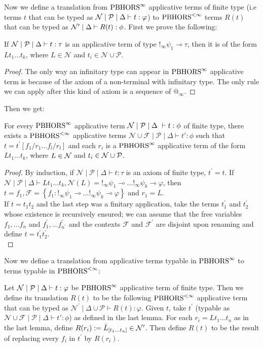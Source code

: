 Now we define a translation from $\text{PBHORS}^{\infty}$ applicative terms of finite type (i.e terms $t$ that can be typed as $\mathcal{N}\mid\mathcal{P}\mid\Delta\vdash t: \varphi $) to $\text{PBHORS}^{<\infty}$ terms $R(t)$ that can be typed as $\mathcal{N}' \mid \Delta \vdash R(t): \phi$. 
First we prove the following:
\begin{lemma}
	If $\mathcal{N}\mid\mathcal{P}\mid\Delta \vdash t: \tau$ is an applicative term of type $!_{\infty} \psi_{1} \multimap \tau$, then it is of the form $L t_{1} \ldots t_{k}$, where $L \in \mathcal{N}$ and $t_{i} \in \mathcal{N} \cup \mathcal{P}$.
\end{lemma}
\begin{proof}
	The only way an infinitary type can appear in $\text{PBHORS}^{\infty}$ applicative term is because of the axiom of a non-terminal with infinitary type. The only rule we can apply after this kind of axiom is a sequence of $@_\infty$.
\end{proof}
Then we get: 
\begin{lemma}
	For every $\text{PBHORS}^{\infty}$ applicative term $\mathcal{N}\mid\mathcal{P}\mid\Delta\ \vdash t: \phi$ of finite type, there exists a $\text{PBHORS}^{<\infty}$ applicative terms $\mathcal{N} \cup \mathcal{F}\mid \mathcal{P}\mid\Delta \vdash t': \phi$ such that $t=t^{\prime}\left[f_{1} / r_{1} \ldots f_{l} / r_{l}\right]$ and each $r_{i}$ is a $\text{PBHORS}^{\infty}$ applicative term of the form $ L t_{1} \ldots t_{k}$, where $L \in \mathcal{N}$ and $t_{i} \in \mathcal{N} \cup \mathcal{P}$.
\end{lemma}
\begin{proof} By induction, if $\mathcal{N}\mid \mathcal{P}\mid \Delta \vdash t: \tau$ is an axiom of finite type, $t^{\prime}=t$. If $\mathcal{N} \mid \mathcal{P} \mid \Delta \vdash L t_1 \dots t_k, \mathcal{N}(L)= !_{\infty} \psi_1 \multimap \ldots !_{\infty} \psi_k \multimap \varphi$, then $t=f_{1}, \mathcal{F}=\left\{f_{1}:  !_{\infty} \psi_1 \multimap \ldots !_{\infty} \psi_k \multimap \varphi\right\}$ and $r_{1}=L$.\\
If $t=t_{1} t_{2}$ and the last step was a finitary application, take the terms $t_{1}^{\prime}$ and $t_{2}^{\prime}$ whose existence is recursively ensured; we can assume that the free variables $f_{1}, \ldots f_{n}$ and $f_{1}^{\prime}, \ldots f_{n^{\prime}}^{\prime}$ and the contexts $\mathcal{F}$ and $\mathcal{F}^{\prime}$ are disjoint upon renaming and define $t=t_{1}^{\prime} t_{2}^{\prime}$.\\
\end{proof}
Now we define a translation from applicative terms typable in $\text{PBHORS}^{\infty}$ to terms typable in $\text{PBHORS}^{<\infty}$: 
\begin{definition}
 Let $\mathcal{N}\mid \mathcal{P}\mid \Delta \vdash t: \varphi$ be $\text{PBHORS}^{\infty}$ applicative term of finite type. Then we define its translation $R(t)$ to be the following $\text{PBHORS}^{<\infty}$ applicative term that can be typed as $\mathcal{N}^{\prime} \mid \Delta \cup \mathcal{P} \vdash R(t): \varphi$. Given $t$, take $t^{\prime}$ (typable as $\mathcal{N} \cup \mathcal{F}\mid \mathcal{P}\mid\Delta \vdash t': \phi$) as defined in the last lemma. For each $r_{i}=L t_{1} \ldots t_{n}$ as in the last lemma, define $R(r_{i}):=\tilde{L}_{\left[t_{1} \ldots t_{n}\right]} \in \mathcal{N}'$. Then define $R(t)$ to be the result of replacing every $f_{i}$ in $t^{\prime}$ by $R\left(r_{i}\right)$. 
\end{definition}
